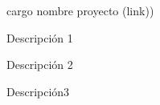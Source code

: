 

\begin{cventries}

  \cventry
    {cargo} %
    {nombre proyecto ({\tiny link)})} %
    {} %
    {} %
    {
      \begin{cvitems} %
        \item {Descripción 1}
        \item{Descripción 2}
        \item{Descripción3}
      \end{cvitems}
    }




\end{cventries}


